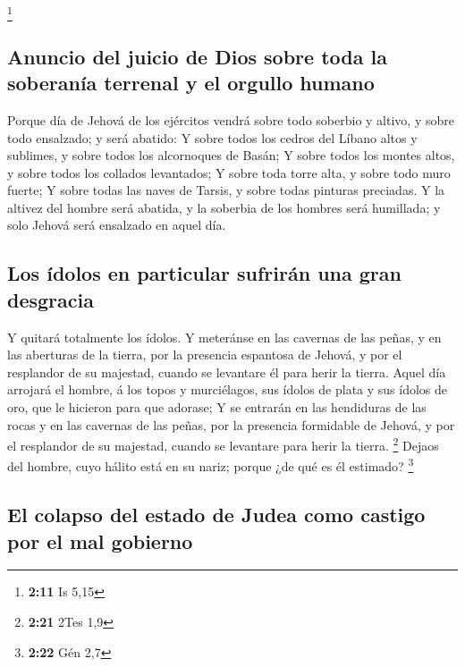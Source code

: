 \footnote{\textbf{2:11} Is 5,15}

\hypertarget{anuncio-del-juicio-de-dios-sobre-toda-la-soberanuxeda-terrenal-y-el-orgullo-humano}{%
\subsection{Anuncio del juicio de Dios sobre toda la soberanía terrenal
y el orgullo
humano}\label{anuncio-del-juicio-de-dios-sobre-toda-la-soberanuxeda-terrenal-y-el-orgullo-humano}}

 Porque día de Jehová de los ejércitos vendrá sobre todo
soberbio y altivo, y sobre todo ensalzado; y será abatido:
 Y sobre todos los cedros del Líbano altos y sublimes, y
sobre todos los alcornoques de Basán;  Y sobre todos los
montes altos, y sobre todos los collados levantados;  Y
sobre toda torre alta, y sobre todo muro fuerte;  Y sobre
todas las naves de Tarsis, y sobre todas pinturas preciadas.
 Y la altivez del hombre será abatida, y la soberbia de
los hombres será humillada; y solo Jehová será ensalzado en aquel día.

\hypertarget{los-uxeddolos-en-particular-sufriruxe1n-una-gran-desgracia}{%
\subsection{Los ídolos en particular sufrirán una gran
desgracia}\label{los-uxeddolos-en-particular-sufriruxe1n-una-gran-desgracia}}

 Y quitará totalmente los ídolos.  Y
meteránse en las cavernas de las peñas, y en las aberturas de la tierra,
por la presencia espantosa de Jehová, y por el resplandor de su
majestad, cuando se levantare él para herir la tierra. 
Aquel día arrojará el hombre, á los topos y murciélagos, sus ídolos de
plata y sus ídolos de oro, que le hicieron para que adorase;
 Y se entrarán en las hendiduras de las rocas y en las
cavernas de las peñas, por la presencia formidable de Jehová, y por el
resplandor de su majestad, cuando se levantare para herir la tierra.
\footnote{\textbf{2:21} 2Tes 1,9}  Dejaos del hombre,
cuyo hálito está en su nariz; porque ¿de qué es él estimado? \footnote{\textbf{2:22}
  Gén 2,7}

\hypertarget{el-colapso-del-estado-de-judea-como-castigo-por-el-mal-gobierno}{%
\subsection{El colapso del estado de Judea como castigo por el mal
gobierno}\label{el-colapso-del-estado-de-judea-como-castigo-por-el-mal-gobierno}}

